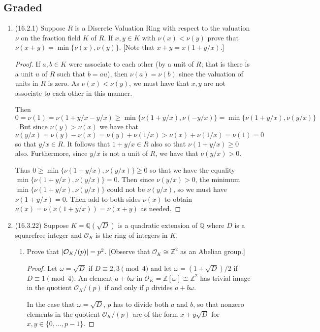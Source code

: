 \documentclass[11pt]{article}
\begin{document}
\subsection*{Graded}
\begin{enumerate}
    \item (16.2.1) Suppose $R$ is a Discrete Valuation Ring with respect to the valuation $\nu$ on the fraction field $K$ of $R$. If $x,y\in K$ with $\nu(x)<\nu(y)$ prove that $\nu(x+y) = \min\{\nu(x),\nu(y)\}$. [Note that $x+y =x(1+y/x)$.] \begin{proof}
        If $a,b\in K$ were associate to each other (by a unit of $R$; that is there is a unit $u$ of $R$ such that $b = au$), then $\nu(a) = \nu(b)$ since the valuation of units in $R$ is zero. As $\nu(x)<\nu(y)$, we must have that $x,y$ are not associate to each other in this manner.

        Then $0= \nu(1) = \nu(1+y/x-y/x) \geq \min\{\nu(1+y/x),\nu(-y/x)\} = \min\{\nu(1+y/x),\nu(y/x)\}$. But since $\nu(y)>\nu(x)$ we have that $\nu(y/x) = \nu(y)-\nu(x) = \nu(y)+\nu(1/x)>\nu(x)+\nu(1/x) = \nu(1) = 0$ so that $y/x\in R$. It follows that $1+y/x\in R$ also so that $\nu(1+y/x)\geq 0$ also. Furthermore, since $y/x$ is not a unit of $R$, we have that $\nu(y/x)>0$. 

        Thus $0\geq \min\{\nu(1+y/x),\nu(y/x)\}\geq 0$ so that we have the equality $\min\{\nu(1+y/x),\nu(y/x)\} = 0$. Then since $\nu(y/x)>0$, the minimum $\min\{\nu(1+y/x),\nu(y/x)\}$ could not be $\nu(y/x)$, so we must have $\nu(1+y/x)=0$. Then add to both sides $\nu(x)$ to obtain $\nu(x) = \nu(x(1+y/x))= \nu(x+y)$ as needed.
    \end{proof}
    \item (16.3.22) Suppose $K = \mathbb{Q}(\sqrt{D})$ is a quadratic extension of $\mathbb{Q}$ where $D$ is a squarefree integer and $\mathcal{O}_K$ is the ring of integers in $K$.\begin{enumerate}
        \item Prove that $\abs{\mathcal{O}_K/(p)}=p^2$. [Observe that $\mathcal{O}_K\cong \mathbb{Z}^2$ as an Abelian group.] \begin{proof}
            Let $\omega = \sqrt{D}$ if $D\equiv 2,3\pmod 4$ and let $\omega = (1+\sqrt{D})/2$ if $D\equiv 1\pmod 4$. An element $a+b\omega$ in $\mathcal{O}_K=\mathbb{Z}[\omega]\cong \mathbb{Z}^2$ has trivial image in the quotient $\mathcal{O}_K/(p)$ if and only if $p$ divides $a+b\omega$. 

            In the case that $\omega = \sqrt{D}$, $p$ has to divide both $a$ and $b$, so that nonzero elements in the quotient $\mathcal{O}_K/(p)$ are of the form $x+y\sqrt{D}$ for $x,y\in \{0,\dots,p-1\}$.


\end{proof}
\end{enumerate}
\end{enumerate}
\end{document}
